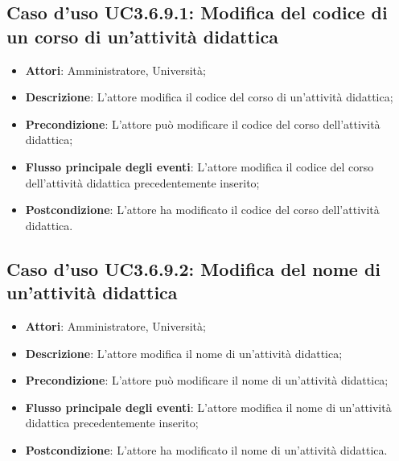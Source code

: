 \subsection{Caso d'uso \texorpdfstring{UC3.6.9.1}{UC3.6.9.1}: Modifica del codice di un corso di un'attività didattica}
\begin{itemize}
\item \textbf{Attori}: Amministratore, Università;
\item \textbf{Descrizione}: L'attore modifica il codice del corso di un'attività didattica;

\item \textbf{Precondizione}: L'attore può modificare il codice del corso dell’attività didattica;

\item \textbf{Flusso principale degli eventi}: L'attore modifica il codice del corso dell’attività didattica precedentemente inserito;

\item \textbf{Postcondizione}: L'attore ha modificato il codice del corso dell’attività didattica.

\end{itemize}
\subsection{Caso d'uso \texorpdfstring{UC3.6.9.2}{UC3.6.9.2}: Modifica del nome di un'attività didattica}
\begin{itemize}
\item \textbf{Attori}: Amministratore, Università;
\item \textbf{Descrizione}: L'attore modifica il nome di un'attività didattica;

\item \textbf{Precondizione}: L'attore può modificare il nome di un'attività didattica;

\item \textbf{Flusso principale degli eventi}: L'attore modifica il nome di un'attività didattica precedentemente inserito;

\item \textbf{Postcondizione}: L'attore ha modificato il nome di un'attività didattica.

\end{itemize}
